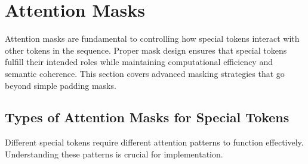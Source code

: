 
\section{Attention Masks}

Attention masks are fundamental to controlling how special tokens interact with other tokens in the sequence. Proper mask design ensures that special tokens fulfill their intended roles while maintaining computational efficiency and semantic coherence. This section covers advanced masking strategies that go beyond simple padding masks.

\subsection{Types of Attention Masks for Special Tokens}

Different special tokens require different attention patterns to function effectively. Understanding these patterns is crucial for implementation.
\begin{comment}
Feedback: Before linking to the code, it's essential to explain the core concepts. For example: "An attention mask is a matrix that tells the transformer which tokens are allowed to 'see' which other tokens. While the padding mask is the most common, special tokens often require custom masks to enforce specific behaviors:
1.  **Gated Attention**: A custom mask can be used to create a 'gate' token. For example, a `<GATE>` token's row in the mask could be all ones (it can see everything), while its column could be all zeros (nothing can see it). This creates a one-way flow of information, perfect for a token that needs to aggregate information without influencing other tokens' representations.
2.  **Segment-Scoped Attention**: For tasks with multiple, independent segments separated by a special token (e.g., `<DOC_SEP>`), a custom mask can be created that prevents attention from flowing *across* the separator. This forces the model to process each document independently until their representations are combined at a higher level.
3.  **Hierarchical Attention**: For structured data, a mask can enforce a hierarchy. For example, a 'paragraph' token might be allowed to attend to all 'sentence' tokens within it, but not to sentences in other paragraphs."
\end{comment}

